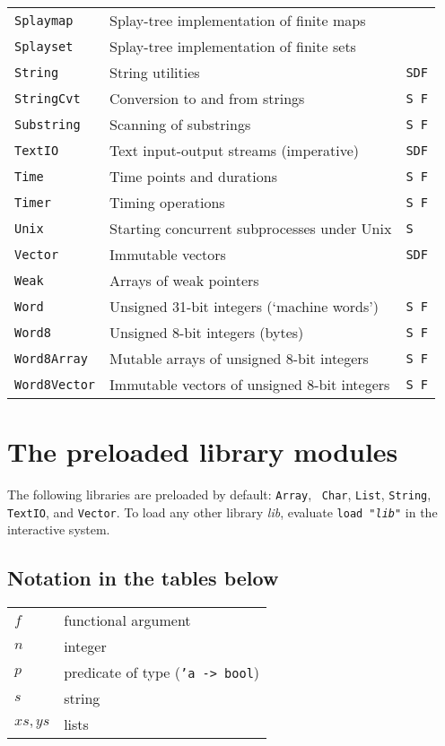 \documentclass[fleqn,a4paper]{article}
\begin{document}
\begin{center}
\begin{tabular}{@{}|lll|}
{\tt Splaymap} & Splay-tree implementation of finite maps &\\
{\tt Splayset} & Splay-tree implementation of finite sets &\\
{\tt String} & String utilities & {\tt SDF}\\
{\tt StringCvt} & Conversion to and from strings & {\tt S F}\\
{\tt Substring} & Scanning of substrings & {\tt S F}\\
{\tt TextIO} & Text input-output streams (imperative) & {\tt SDF}\\
{\tt Time}   & Time points and durations & {\tt S F}\\
{\tt Timer}  & Timing operations & {\tt S F}\\
{\tt Unix}   & Starting concurrent subprocesses under Unix & {\tt S}\\
{\tt Vector} & Immutable vectors & {\tt SDF}\\
{\tt Weak}   & Arrays of weak pointers & \\
{\tt Word}   & Unsigned 31-bit integers (`machine words') & {\tt S F}\\
{\tt Word8}  & Unsigned 8-bit integers (bytes) & {\tt S F}\\
{\tt Word8Array}  & Mutable arrays of unsigned 8-bit integers & {\tt S F}\\
{\tt Word8Vector} & Immutable vectors of unsigned 8-bit integers
        & {\tt S F}\\\hline
\end{tabular}
\label{table-predefined-units}
\end{center}


\newpage

\section{The preloaded library modules}

The following libraries are preloaded by default: {\tt Array}, {\tt
  Char}, {\tt List}, {\tt String}, {\tt TextIO}, and {\tt Vector}.  To
load any other library {\it lib\/}, evaluate {\tt load "{\it lib\/}"}
in the interactive system.


\subsection*{Notation in the tables below}

\begin{center}
\begin{tabular}{|l|l|}\hline
$f$ & functional argument\\
$n$ & integer\\
$p$ & predicate of type  ({\tt 'a -> bool})\\
$s$ & string\\
$xs, ys$ & lists\\\hline
\end{tabular}
\end{center}
\end{document}
